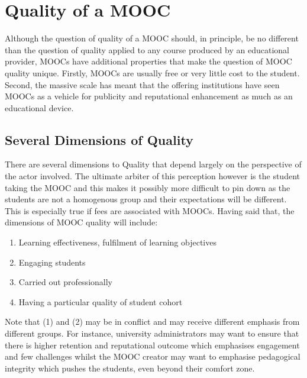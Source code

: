 \section{Quality of a MOOC}




Although the question of quality of a MOOC should, in principle, be no
different than the question of quality applied to any course produced by
an educational provider, MOOCs have additional properties that make the
question of MOOC quality unique. Firstly, MOOCs are usually free or very
little cost to the student. Second, the massive scale has meant that the
offering institutions have seen MOOCs as a vehicle for publicity and
reputational enhancement as much as an educational device.

\subsection{Several Dimensions of Quality}

There are several dimensions to Quality that depend largely on the
perspective of the actor involved. The ultimate arbiter of this
perception however is the student taking the MOOC and this makes it
possibly more difficult to pin down as the students are not a homogenous
group and their expectations will be different. This is especially true
if fees are associated with MOOCs.  Having said that, the dimensions of
MOOC quality will include:

\begin{enumerate}

\item Learning effectiveness, fulfilment of learning objectives 

\item Engaging students

\item Carried out professionally

\item Having a particular quality of student cohort

\end{enumerate}


Note that (1) and (2) may be in conflict and may receive different
emphasis from different groups. For instance, university administrators
may want to ensure that there is higher retention and reputational
outcome which emphasises engagement and few challenges whilst the MOOC
creator may want to emphasise pedagogical integrity which pushes the
students, even beyond their comfort zone.

